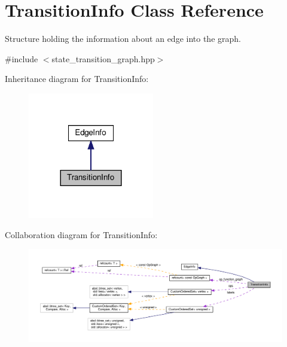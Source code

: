 \hypertarget{classTransitionInfo}{}\section{Transition\+Info Class Reference}
\label{classTransitionInfo}


Structure holding the information about an edge into the graph.  




{\ttfamily \#include $<$state\+\_\+transition\+\_\+graph.\+hpp$>$}



Inheritance diagram for Transition\+Info\+:
\nopagebreak
\begin{figure}[H]
\begin{center}
\leavevmode
\includegraphics[width=156pt]{d2/dd3/classTransitionInfo__inherit__graph}
\end{center}
\end{figure}


Collaboration diagram for Transition\+Info\+:
\nopagebreak
\begin{figure}[H]
\begin{center}
\leavevmode
\includegraphics[width=350pt]{d6/d7c/classTransitionInfo__coll__graph}
\end{center}
\end{figure}
